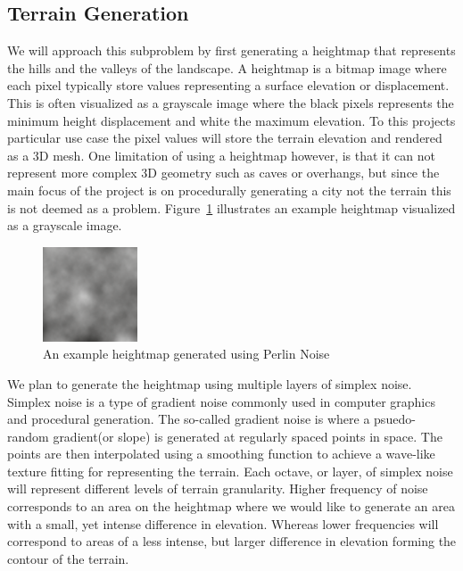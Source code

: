\subsection{Terrain Generation}
We will approach this subproblem by first generating a heightmap that represents the hills and the valleys of the landscape.
A heightmap is a bitmap image where each pixel typically store values representing a surface elevation or displacement.
This is often visualized as a grayscale image where the black pixels represents the minimum height displacement and white the maximum elevation.
To this projects particular use case the pixel values will store the terrain elevation and rendered as a 3D mesh.
One limitation of using a heightmap however, is that it can not represent more complex 3D geometry such as caves or overhangs, but since the main focus of the project is on procedurally generating a city not the terrain this is not deemed as a problem.
Figure~\ref{fig:heightmap} illustrates an example heightmap visualized as a grayscale image.

\begin{figure}[h]
  \centering
  \includegraphics[width=0.25\textwidth]{figure/heightmap.png}
  \caption{An example heightmap generated using Perlin Noise}
  \label{fig:heightmap}
\end{figure}

We plan to generate the heightmap using multiple layers of simplex noise.
Simplex noise is a type of gradient noise commonly used in computer graphics and procedural generation.
The so-called gradient noise is where a psuedo-random gradient(or slope) is generated at regularly spaced points in space.
The points are then interpolated using a smoothing function to achieve a wave-like texture fitting for representing the terrain.
Each octave, or layer, of simplex noise will represent different levels of terrain granularity.
Higher frequency of noise corresponds to an area on the heightmap where we would like to generate an area with a small, yet intense difference in elevation.
Whereas lower frequencies will correspond to areas of a less intense, but larger difference in elevation forming the contour of the terrain.

